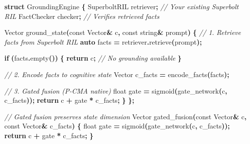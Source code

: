 \documentclass[
  11pt,
  a4paper,
]{article}
\newenvironment{Shaded}{\begin{snugshade}}{\end{snugshade}}
\newcommand{\AttributeTok}[1]{\textcolor[rgb]{0.13,0.29,0.53}{#1}}
\newcommand{\CommentTok}[1]{\textcolor[rgb]{0.56,0.35,0.01}{\textit{#1}}}
\newcommand{\ControlFlowTok}[1]{\textcolor[rgb]{0.13,0.29,0.53}{\textbf{#1}}}
\newcommand{\DataTypeTok}[1]{\textcolor[rgb]{0.13,0.29,0.53}{#1}}
\newcommand{\KeywordTok}[1]{\textcolor[rgb]{0.13,0.29,0.53}{\textbf{#1}}}
\newcommand{\NormalTok}[1]{#1}
\newcommand{\OperatorTok}[1]{\textcolor[rgb]{0.81,0.36,0.00}{\textbf{#1}}}
\begin{document}
\begin{Shaded}
\begin{Highlighting}[]
\KeywordTok{struct}\NormalTok{ GroundingEngine }\OperatorTok{\{}
\NormalTok{    SuperboltRIL retriever}\OperatorTok{;}  \CommentTok{// Your existing Superbolt RIL}
\NormalTok{    FactChecker checker}\OperatorTok{;}      \CommentTok{// Verifies retrieved facts}
    
\NormalTok{    Vector ground\_state}\OperatorTok{(}\AttributeTok{const}\NormalTok{ Vector}\OperatorTok{\&}\NormalTok{ c}\OperatorTok{,} \AttributeTok{const}\NormalTok{ string}\OperatorTok{\&}\NormalTok{ prompt}\OperatorTok{)} \OperatorTok{\{}
        \CommentTok{// 1. Retrieve facts from Superbolt RIL}
        \KeywordTok{auto}\NormalTok{ facts }\OperatorTok{=}\NormalTok{ retriever}\OperatorTok{.}\NormalTok{retrieve}\OperatorTok{(}\NormalTok{prompt}\OperatorTok{);}
        
        \ControlFlowTok{if} \OperatorTok{(}\NormalTok{facts}\OperatorTok{.}\NormalTok{empty}\OperatorTok{())} \OperatorTok{\{}
            \ControlFlowTok{return}\NormalTok{ c}\OperatorTok{;}  \CommentTok{// No grounding available}
        \OperatorTok{\}}
        
        \CommentTok{// 2. Encode facts to cognitive state}
\NormalTok{        Vector c\_facts }\OperatorTok{=}\NormalTok{ encode\_facts}\OperatorTok{(}\NormalTok{facts}\OperatorTok{);}
        
        \CommentTok{// 3. Gated fusion (P{-}CMA native)}
        \DataTypeTok{float}\NormalTok{ gate }\OperatorTok{=}\NormalTok{ sigmoid}\OperatorTok{(}\NormalTok{gate\_network}\OperatorTok{(}\NormalTok{c}\OperatorTok{,}\NormalTok{ c\_facts}\OperatorTok{));}
        \ControlFlowTok{return}\NormalTok{ c }\OperatorTok{+}\NormalTok{ gate }\OperatorTok{*}\NormalTok{ c\_facts}\OperatorTok{;}
    \OperatorTok{\}}
\OperatorTok{\};}

\CommentTok{// Gated fusion preserves state dimension}
\NormalTok{Vector gated\_fusion}\OperatorTok{(}\AttributeTok{const}\NormalTok{ Vector}\OperatorTok{\&}\NormalTok{ c}\OperatorTok{,} \AttributeTok{const}\NormalTok{ Vector}\OperatorTok{\&}\NormalTok{ c\_facts}\OperatorTok{)} \OperatorTok{\{}
    \DataTypeTok{float}\NormalTok{ gate }\OperatorTok{=}\NormalTok{ sigmoid}\OperatorTok{(}\NormalTok{gate\_network}\OperatorTok{(}\NormalTok{c}\OperatorTok{,}\NormalTok{ c\_facts}\OperatorTok{));}
    \ControlFlowTok{return}\NormalTok{ c }\OperatorTok{+}\NormalTok{ gate }\OperatorTok{*}\NormalTok{ c\_facts}\OperatorTok{;}
\OperatorTok{\}}
\end{Highlighting}
\end{Shaded}
\end{document}
